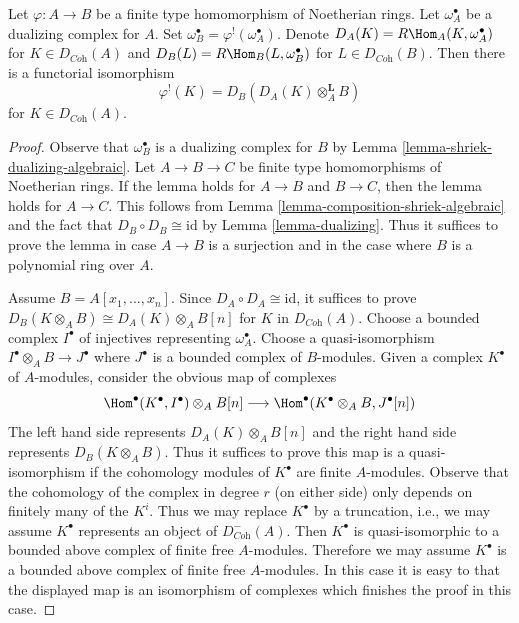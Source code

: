 \begin{lemma}
\label{lemma-relative-dualizing-if-have-omega}
Let $\varphi : A \to B$ be a finite type homomorphism of Noetherian rings.
Let $\omega_A^\bullet$ be a dualizing complex for $A$. Set
$\omega_B^\bullet = \varphi^!(\omega_A^\bullet)$. Denote
$D_A(K) = R\Hom_A(K, \omega_A^\bullet)$ for $K \in D_{\textit{Coh}}(A)$
and
$D_B(L) = R\Hom_B(L, \omega_B^\bullet)$ for $L \in D_{\textit{Coh}}(B)$.
Then there is a functorial isomorphism
$$
\varphi^!(K) = D_B(D_A(K) \otimes_A^\mathbf{L} B)
$$
for $K \in D_{\textit{Coh}}(A)$.
\end{lemma}

\begin{proof}
Observe that $\omega_B^\bullet$ is a dualizing complex for $B$ by
Lemma \ref{lemma-shriek-dualizing-algebraic}.
Let $A \to B \to C$ be finite type homomorphisms of Noetherian rings.
If the lemma holds for $A \to B$ and $B \to C$, then the lemma holds for
$A \to C$. This follows from
Lemma \ref{lemma-composition-shriek-algebraic}
and the fact that $D_B \circ D_B \cong \text{id}$ by
Lemma \ref{lemma-dualizing}.
Thus it suffices to prove the lemma in case $A \to B$ is
a surjection and in the case where $B$ is a
polynomial ring over $A$.

\medskip\noindent
Assume $B = A[x_1, \ldots, x_n]$. Since $D_A \circ D_A \cong \text{id}$,
it suffices to prove
$D_B(K \otimes_A B) \cong D_A(K) \otimes_A B[n]$ for $K$
in $D_{\textit{Coh}}(A)$.
Choose a bounded complex $I^\bullet$ of injectives representing
$\omega_A^\bullet$. Choose a quasi-isomorphism
$I^\bullet \otimes_A B \to J^\bullet$ where $J^\bullet$
is a bounded complex of $B$-modules. Given a complex
$K^\bullet$ of $A$-modules, consider the obvious
map of complexes
$$
\Hom^\bullet(K^\bullet, I^\bullet) \otimes_A B[n]
\longrightarrow
\Hom^\bullet(K^\bullet \otimes_A B, J^\bullet[n])
$$
The left hand side represents $D_A(K) \otimes_A B[n]$ and the right hand
side represents $D_B(K \otimes_A B)$. Thus it suffices to prove this
map is a quasi-isomorphism if the cohomology modules
of $K^\bullet$ are finite $A$-modules. Observe that the
cohomology of the complex in degree $r$ (on either side)
only depends on finitely many of the $K^i$. Thus we may
replace $K^\bullet$ by a truncation, i.e., we may assume
$K^\bullet$ represents an object of $D^-_{\textit{Coh}}(A)$.
Then $K^\bullet$ is quasi-isomorphic to a bounded
above complex of finite free $A$-modules.
Therefore we may assume $K^\bullet$ is a bounded
above complex of finite free $A$-modules.
In this case it is easy to that the
displayed map is an isomorphism of complexes which finishes
the proof in this case.


\end{proof}

